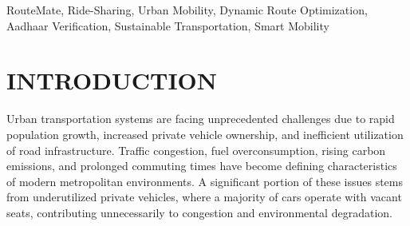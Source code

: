 \documentclass[conference]{IEEEtran}
\begin{document}
\maketitle

\begin{abstract}
This paper presents RouteMate, a next-generation ride-sharing platform designed to address urban traffic congestion and excessive fuel consumption through optimized vehicle usage. The system enables private vehicle owners to share rides with passengers whose destinations align with their intended routes using real-time, route-based matching. Unlike traditional ride-sharing platforms that rely on fixed schedules or commercial fleets, RouteMate facilitates spontaneous and flexible ride coordination for daily commuters. The platform integrates Aadhaar-based user verification to ensure security, trust, and accountability among users. Additionally, advanced location tracking and dynamic route optimization algorithms are employed to minimize detours, reduce travel time, and improve ride efficiency. To encourage long-term participation, RouteMate incorporates an incentive-driven reward mechanism that provides fuel vouchers, carbon credit points, and user discounts. By maximizing vehicle occupancy and reducing single-passenger travel, the system contributes to sustainable transportation, reduced emissions, and a smarter urban mobility ecosystem.
\end{abstract}

\begin{IEEEkeywords}
RouteMate, Ride-Sharing, Urban Mobility, Dynamic Route Optimization, Aadhaar Verification, Sustainable Transportation, Smart Mobility
\end{IEEEkeywords}

\section{INTRODUCTION}

Urban transportation systems are facing unprecedented challenges due to rapid population growth, increased private vehicle ownership, and inefficient utilization of road infrastructure. Traffic congestion, fuel overconsumption, rising carbon emissions, and prolonged commuting times have become defining characteristics of modern metropolitan environments. A significant portion of these issues stems from underutilized private vehicles, where a majority of cars operate with vacant seats, contributing unnecessarily to congestion and environmental degradation.
\end{document}
